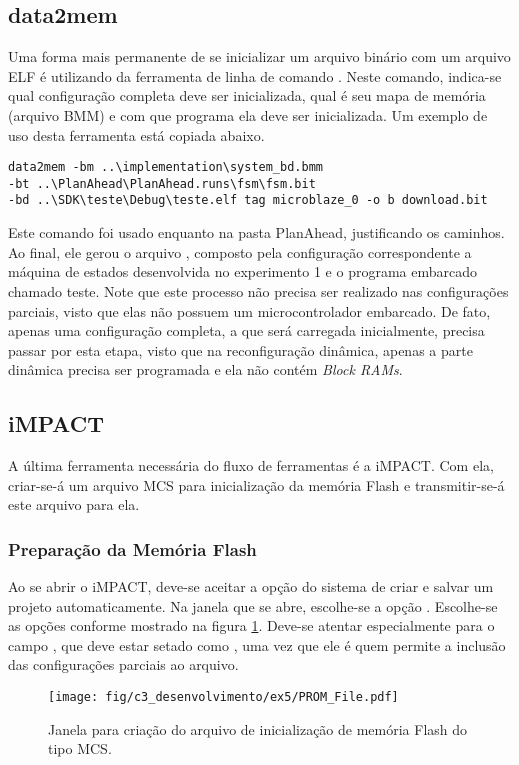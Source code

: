 \documentclass[11pt,a4paper,oneside]{book}
\begin{document}
\subsection{data2mem}
Uma forma mais permanente de se inicializar um arquivo binário com um arquivo ELF é utilizando da ferramenta de linha de comando .
Neste comando, indica-se qual configuração completa deve ser inicializada, qual é seu mapa de memória (arquivo BMM) e com que programa ela deve ser inicializada.
Um exemplo de uso desta ferramenta está copiada abaixo.
\begin{lstlisting}
data2mem -bm ..\implementation\system_bd.bmm
-bt ..\PlanAhead\PlanAhead.runs\fsm\fsm.bit
-bd ..\SDK\teste\Debug\teste.elf tag microblaze_0 -o b download.bit
\end{lstlisting}
Este comando foi usado enquanto na pasta PlanAhead, justificando os caminhos.
Ao final, ele gerou o arquivo , composto pela configuração correspondente a máquina de estados desenvolvida no experimento 1 e o programa embarcado chamado teste.
Note que este processo não precisa ser realizado nas configurações parciais, visto que elas não possuem um microcontrolador embarcado.
De fato, apenas uma configuração completa, a que será carregada inicialmente, precisa passar por esta etapa, visto que na reconfiguração dinâmica, apenas a parte dinâmica precisa ser programada e ela não contém \textit{Block RAMs}.

\subsection{iMPACT}
A última ferramenta necessária do fluxo de ferramentas é a iMPACT.
Com ela, criar-se-á um arquivo MCS para inicialização da memória Flash e transmitir-se-á este arquivo para ela.

\subsubsection{Preparação da Memória Flash}
Ao se abrir o iMPACT, deve-se aceitar a opção do sistema de criar e salvar um projeto automaticamente.
Na janela que se abre, escolhe-se a opção .
Escolhe-se as opções conforme mostrado na figura \ref{fig:ex5:prom}.
Deve-se atentar especialmente para o campo , que deve estar setado como , uma vez que ele é quem permite a inclusão das configurações parciais ao arquivo.

\begin{figure}[htp]
\centering
\texttt{[image: fig/c3\_desenvolvimento/ex5/PROM\_File.pdf]}
\caption{Janela para criação do arquivo de inicialização de memória Flash do tipo MCS.}
\label{fig:ex5:prom}
\end{figure}
\end{document}
